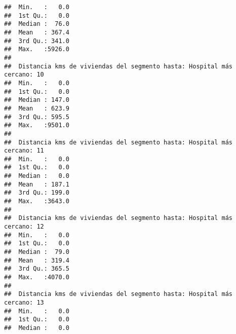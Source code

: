 \documentclass[11pt,]{article}
\begin{document}
\begin{verbatim}
##  Min.   :   0.0                                                        
##  1st Qu.:   0.0                                                        
##  Median :  76.0                                                        
##  Mean   : 367.4                                                        
##  3rd Qu.: 341.0                                                        
##  Max.   :5926.0                                                        
##                                                                        
##  Distancia kms de viviendas del segmento hasta: Hospital más cercano: 10
##  Min.   :   0.0                                                         
##  1st Qu.:   0.0                                                         
##  Median : 147.0                                                         
##  Mean   : 623.9                                                         
##  3rd Qu.: 595.5                                                         
##  Max.   :9501.0                                                         
##                                                                         
##  Distancia kms de viviendas del segmento hasta: Hospital más cercano: 11
##  Min.   :   0.0                                                         
##  1st Qu.:   0.0                                                         
##  Median :   0.0                                                         
##  Mean   : 187.1                                                         
##  3rd Qu.: 199.0                                                         
##  Max.   :3643.0                                                         
##                                                                         
##  Distancia kms de viviendas del segmento hasta: Hospital más cercano: 12
##  Min.   :   0.0                                                         
##  1st Qu.:   0.0                                                         
##  Median :  79.0                                                         
##  Mean   : 319.4                                                         
##  3rd Qu.: 365.5                                                         
##  Max.   :4070.0                                                         
##                                                                         
##  Distancia kms de viviendas del segmento hasta: Hospital más cercano: 13
##  Min.   :   0.0                                                         
##  1st Qu.:   0.0                                                         
##  Median :   0.0                                                         

\end{verbatim}
\end{document}
